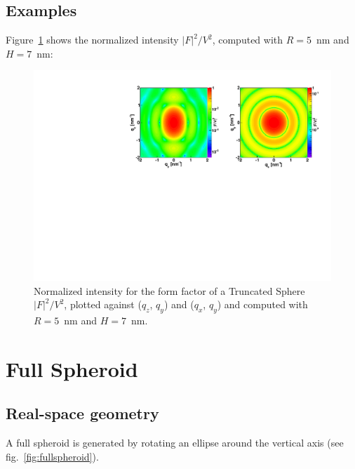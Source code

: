 \subsection{Examples}
Figure~\ref{fig:SphereEx} shows the normalized intensity $|F|^2/V^2$, computed with $R=5$~nm and $H=7$~nm:
\begin{figure}[h]
\begin{center}
\includegraphics[width=\textwidth]{Figures/figffsphere}
\end{center}
\caption{Normalized intensity for the form factor of a Truncated Sphere
  $|F|^2/V^2$, plotted against ($q_z$, $q_y$) and ($q_x$, $q_y$) and
  computed with $R=5$~nm and $H=7$~nm.}
\label{fig:SphereEx}
\end{figure}

\FloatBarrier


\newpage{\cleardoublepage}
\section{Full Spheroid}   

\subsection{Real-space geometry}
A full spheroid is generated by rotating an ellipse around the vertical
axis (see fig.~\ref{fig:fullspheroid}).

